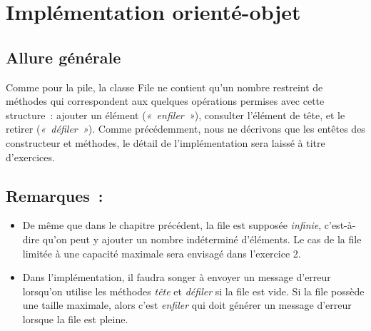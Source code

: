 \section{Implémentation orienté-objet}

	\subsection{Allure générale}
		
		Comme pour la pile, la classe File ne contient qu'un nombre 
		restreint de méthodes qui correspondent aux quelques
		opérations permises avec cette structure~: ajouter un élément 
		(\textit{«~enfiler~»}), consulter l'élément de tête, et
		le retirer (\textit{«~défiler~»}). Comme précédemment, nous ne 
		décrivons que les entêtes des constructeur et méthodes,
		le détail de l'implémentation sera laissé à titre d'exercices.

		
	\subsection{Remarques~:}
		
		\begin{itemize}
			\item 
				De même que dans le chapitre précédent, la file est supposée 
				\textit{infinie}, c'est-à-dire qu'on peut y ajouter un
				nombre indéterminé d'éléments. Le cas de la file limitée à 
				une capacité maximale sera envisagé dans l'exercice 2.
			\item
				Dans l'implémentation, il faudra songer à envoyer un message 
				d'erreur lorsqu'on utilise les méthodes \textit{tête} et
				\textit{défiler} si la file est vide. Si la file possède une 
				taille maximale, alors c'est \textit{enfiler} qui doit
				générer un message d'erreur lorsque la file est pleine.
		\end{itemize}

